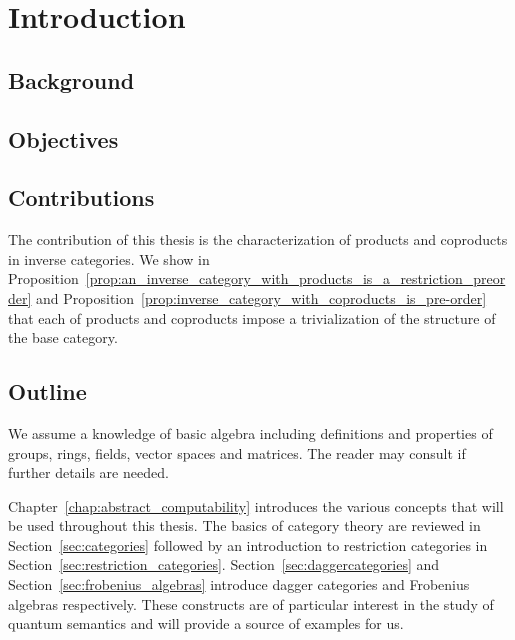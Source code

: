 \chapter{Introduction}
\section{Background}
\label{sec:background}

\section{Objectives}
\label{sec:objectives}

\section{Contributions}
\label{sec:contributions}

The contribution of this thesis is the characterization of products and coproducts in inverse
categories. We show in Proposition~\ref{prop:an_inverse_category_with_products_is_a_restriction_preorder}
and Proposition~\ref{prop:inverse_category_with_coproducts_is_pre-order} that each of products and
coproducts impose a trivialization of the structure of the base category.

\section{Outline} %
\label{sec:outline}

We assume a knowledge of basic algebra including definitions and properties of groups, rings,
fields, vector spaces and matrices. The reader may consult \cite{lang:algebra} if further details
are needed.

Chapter~\ref{chap:abstract_computability} introduces the various concepts that will be used
throughout this thesis. The basics of category theory are reviewed in Section~\ref{sec:categories}
followed by an introduction to restriction categories in
Section~\ref{sec:restriction_categories}. Section~\ref{sec:daggercategories} and
Section~\ref{sec:frobenius_algebras}  introduce dagger categories and Frobenius
algebras respectively. These constructs are of particular interest in the study of quantum semantics
and will provide a source of examples for us.

